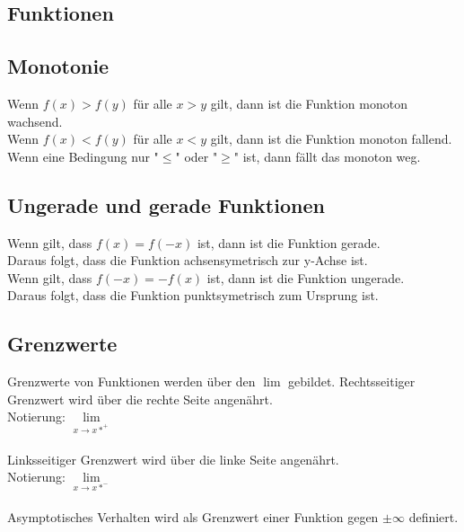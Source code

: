 \documentclass[a4paper,landscape, 11pt]{article}
\newcommand{\limFromTo}[2]{ \lim\limits_{#2 \rightarrow #1}}
\begin{document}
\begin{multicols}{4}
\begin{small}
    			
     \section{Funktionen}
             \subsection{Monotonie}
                 Wenn $f(x) > f(y)$ für alle $x > y$ gilt, dann ist die Funktion monoton wachsend. \\
                 Wenn $f(x) < f(y)$ für alle $x < y$ gilt, dann ist die Funktion monoton fallend. \\
                 Wenn eine Bedingung nur "$\le$" oder "$\ge$" ist, dann fällt das monoton weg.
                 
             \subsection{Ungerade und gerade Funktionen}
                 Wenn gilt, dass $f(x) = f(-x)$ ist, dann ist die Funktion gerade. \\
                 Daraus folgt, dass die Funktion achsensymetrisch zur y-Achse ist.\\
                 Wenn gilt, dass $f(-x) = -f(x)$ ist, dann ist die Funktion ungerade.\\
                 Daraus folgt, dass die Funktion punktsymetrisch zum Ursprung ist.
              
              \subsection{Grenzwerte}
                  Grenzwerte von Funktionen werden über den $\lim$ gebildet.
                  Rechtsseitiger Grenzwert wird über die rechte Seite angenährt. \\
                  Notierung: $\limFromTo{x*^+}{x}$ \\ 
                  \\
                  Linksseitiger Grenzwert wird über die linke Seite angenährt. \\
                  Notierung: $\limFromTo{x*^-}{x}$ \\ 
                  \\
                  Asymptotisches Verhalten wird als Grenzwert einer Funktion gegen $\pm \infty$ definiert.

\end{small}
\end{multicols}
\end{document}
